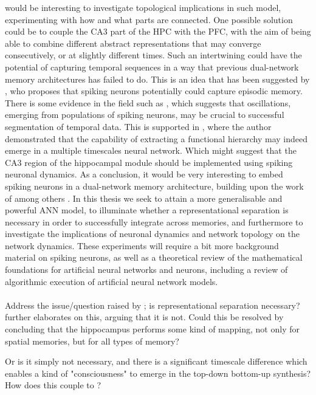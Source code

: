 would be interesting to investigate topological implications in such model, experimenting with how and what parts are connected. One possible solution could be to couple the CA3 part of the HPC with the PFC, with the aim of being able to combine different abstract representations that may converge consecutively, or at slightly different times. Such an intertwining could have the potential of capturing temporal sequences in a way that previous dual-network memory architectures has failed to do. This is an idea that has been suggested by \cite{Hattori2014}, who proposes that spiking neurons potentially could capture episodic memory. There is some evidence in the field such as \cite{Solbakken2009, Buzsaki2002, Buzsaki2005}, which suggests that oscillations, emerging from populations of spiking neurons, may be crucial to successful segmentation of temporal data. This is supported in \cite{Tani2014}, where the author demonstrated that the capability of extracting a functional hierarchy may indeed emerge in a multiple timescales neural network. Which might suggest that the CA3 region of the hippocampal module should be implemented using spiking neuronal dynamics. As a conclusion, it would be very interesting to embed spiking neurons in a dual-network memory architecture, building upon the work of among others \cite{Yamashita2008, McClelland1995}. In this thesis we seek to attain a more generalisable and powerful ANN model, to illuminate whether a representational separation is necessary in order to successfully integrate across memories, and furthermore to investigate the implications of neuronal dynamics and network topology on the network dynamics. These experiments will require a bit more background material on spiking neurons, as well as a theoretical review of the mathematical foundations for artificial neural networks and neurons, including a review of algorithmic execution of artificial neural network models.
\\\\
Address the issue/question raised by \cite{French1999}; is representational separation necessary? \cite{Buzsaki2005} further elaborates on this, arguing that it is not. Could this be resolved by concluding that the hippocampus performs some kind of mapping, not only for spatial memories, but for all types of memory?

Or is it simply not necessary, and there is a significant timescale difference which enables a kind of "consciousness" to emerge in the top-down bottom-up synthesis? How does this couple to \cite{Tani2014}?


\cleardoublepage